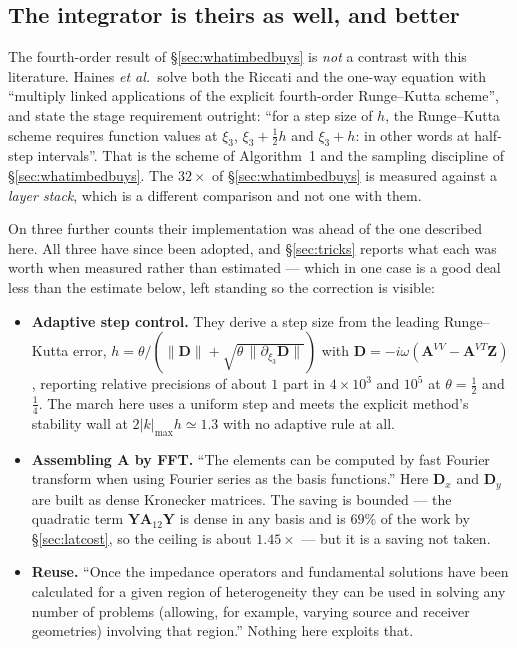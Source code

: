 \documentclass[11pt,a4paper]{article}
\newcommand{\bA}{\mathbf{A}}
\newcommand{\bY}{\mathbf{Y}}
\begin{document}
\subsection{The integrator is theirs as well, and better}

The fourth-order result of \S\ref{sec:whatimbedbuys} is \emph{not} a contrast
with this literature.  Haines \emph{et al.}\ solve both the Riccati and the
one-way equation with ``multiply linked applications of the explicit
fourth-order Runge--Kutta scheme'', and state the stage requirement outright:
``for a step size of $h$, the Runge--Kutta scheme requires function values at
$\xi_3$, $\xi_3+\tfrac12 h$ and $\xi_3+h$: in other words at half-step
intervals''.  That is the scheme of Algorithm~1 and the sampling discipline of
\S\ref{sec:whatimbedbuys}.  The $32\times$ of \S\ref{sec:whatimbedbuys} is
measured against a \emph{layer stack}, which is a different comparison and not
one with them.

On three further counts their implementation was ahead of the one described
here.  All three have since been adopted, and \S\ref{sec:tricks} reports what
each was worth when measured rather than estimated --- which in one case is a
good deal less than the estimate below, left standing so the correction is
visible:

\begin{itemize}
\item \textbf{Adaptive step control.}  They derive a step size from the leading
Runge--Kutta error, $h = \theta/(\|\mathbf{D}\| +
\sqrt{\theta\,\|\partial_{\xi_3}\mathbf{D}\|})$ with
$\mathbf{D}=-i\omega(\bA^{VV}-\bA^{VT}\mathbf{Z})$, reporting relative
precisions of about $1$ part in $4\times10^{3}$ and $10^{5}$ at
$\theta=\tfrac12$ and $\tfrac14$.  The march here uses a uniform step and meets
the explicit method's stability wall at $2|k|_{\max}h \simeq 1.3$ with no
adaptive rule at all.
\item \textbf{Assembling $\bA$ by FFT.}  ``The elements can be computed by fast
Fourier transform when using Fourier series as the basis functions.''  Here
$\mathbf{D}_x$ and $\mathbf{D}_y$ are built as dense Kronecker matrices.  The
saving is bounded --- the quadratic term $\bY\bA_{12}\bY$ is dense in any basis
and is $69\%$ of the work by \S\ref{sec:latcost}, so the ceiling is about
$1.45\times$ --- but it is a saving not taken.
\item \textbf{Reuse.}  ``Once the impedance operators and fundamental solutions
have been calculated for a given region of heterogeneity they can be used in
solving any number of problems (allowing, for example, varying source and
receiver geometries) involving that region.''  Nothing here exploits that.
\end{itemize}
\end{document}
